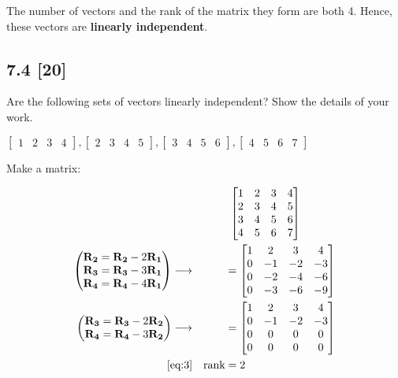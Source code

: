 \documentclass{article}
\begin{document}
The number of vectors and the rank of the matrix they form are both 4.  Hence, these vectors are \textbf{linearly independent}.

\subsection*{7.4 [20]}
\setcounter{equation}{0}

Are the following sets of vectors linearly independent?  Show the details of your work.

$
\begin{bmatrix}
1&2&3&4
\end{bmatrix}, \begin{bmatrix}
2&3&4&5
\end{bmatrix}, \begin{bmatrix}
3&4&5&6
\end{bmatrix}, \begin{bmatrix}
4&5&6&7
\end{bmatrix}
$

Make a matrix:

\begin{align}
    \label{eq:1}
    && &\text{ } \begin{bmatrix}
    1&2&3&4\\
    2&3&4&5\\
    3&4&5&6\\
    4&5&6&7
    \end{bmatrix}
    \\
    \label{eq:2}
    \begin{pmatrix}
    \textbf{R\textsubscript{2}} = \textbf{R\textsubscript{2}} - 2\textbf{R\textsubscript{1}}\\
    \textbf{R\textsubscript{3}} = \textbf{R\textsubscript{3}} - 3\textbf{R\textsubscript{1}}\\
    \textbf{R\textsubscript{4}} = \textbf{R\textsubscript{4}} - 4\textbf{R\textsubscript{1}}
    \end{pmatrix} \longrightarrow && &=\begin{bmatrix}
    1&2&3&4\\
    0&-1&-2&-3\\
    0&-2&-4&-6\\
    0&-3&-6&-9
    \end{bmatrix}
    \\
    \label{eq:3}
    \begin{pmatrix}
    \textbf{R\textsubscript{3}} = \textbf{R\textsubscript{3}} - 2\textbf{R\textsubscript{2}}\\
    \textbf{R\textsubscript{4}} = \textbf{R\textsubscript{4}} - 3\textbf{R\textsubscript{2}} 
    \end{pmatrix} \longrightarrow && &= \begin{bmatrix}
    1&2&3&4\\
    0&-1&-2&-3\\
    0&0&0&0\\
    0&0&0&0
    \end{bmatrix}
    \\
    \label{eq:4}
    \eqref{eq:3} && \text{rank} &= 2
\end{align}
\end{document}
